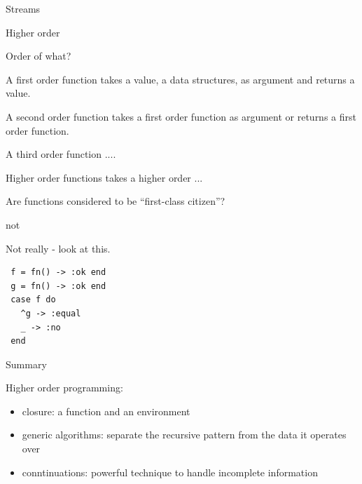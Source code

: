 \begin{frame}{Streams}


\end{frame}


\begin{frame}{Higher order}

Order of what?

\pause\vspace{20pt}
A first order function takes a value, a data structures, as argument and returns a value.

\pause\vspace{20pt}
A second order function takes a first order function as argument or returns a first order function.

\pause\vspace{20pt}
A third order function ....

\pause\vspace{20pt}
Higher order functions takes a higher order ...

\pause\vspace{20pt}
Are functions considered to be ``first-class citizen''?
\end{frame}

\begin{frame}[fragile]{not}
    
  \vspace{20pt}Not really - look at this.
    
\begin{verbatim}
 f = fn() -> :ok end
 g = fn() -> :ok end
 case f do
   ^g -> :equal
   _ -> :no
 end
\end{verbatim}

\end{frame}


\begin{frame}{Summary}

\pause Higher order programming:

\begin{itemize}
\pause\item {closure}: a function and an environment
\pause\item {generic algorithms}: separate the recursive pattern from the data it operates over
\pause\item {conntinuations}: powerful technique to handle incomplete information
\end{itemize}


\end{frame}






